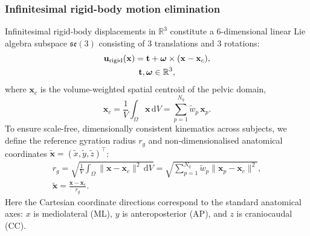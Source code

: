 \documentclass[pdflatex,sn-basic]{sn-jnl}
\begin{document}
\subsubsection{Infinitesimal rigid-body motion elimination}
Infinitesimal rigid-body displacements in $\mathbb{R}^3$ constitute a 6-dimensional linear Lie algebra subspace $\mathfrak{se}(3)$ consisting of 3 translations and 3 rotations:
\begin{equation}
\begin{gathered}
\mathbf u_{\rm rigid}(\mathbf x) = \mathbf t + \boldsymbol\omega \times (\mathbf x - \mathbf x_c), \\
 \mathbf t, \boldsymbol\omega \in \mathbb{R}^3,
\label{eq:rigid-field}
\end{gathered}
\end{equation}
where $\mathbf x_c$ is the volume-weighted spatial centroid of the pelvic domain,
\begin{equation}
\mathbf x_c = \frac{1}{V}\int_\Omega \mathbf x\,\mathrm dV = \sum_{p=1}^{N_q} \tilde w_p \, \mathbf x_p.
\end{equation}
To ensure scale-free, dimensionally consistent kinematics across subjects, we define the reference gyration radius $r_g$ and non-dimensionalised anatomical coordinates $\tilde{\mathbf x} = (\tilde x, \tilde y, \tilde z)^\top$:
\begin{equation}
\begin{gathered}
r_g = \sqrt{\frac{1}{V}\int_\Omega\|\mathbf x-\mathbf x_c\|^2\,\mathrm dV} = \sqrt{\sum_{p=1}^{N_q} \tilde w_p \|\mathbf x_p - \mathbf x_c\|^2}, \\
\tilde{\mathbf x} = \frac{\mathbf x - \mathbf x_c}{r_g}.
\label{eq:dimless-coords}
\end{gathered}
\end{equation}
Here the Cartesian coordinate directions correspond to the standard anatomical axes: $x$ is mediolateral (ML), $y$ is anteroposterior (AP), and $z$ is craniocaudal (CC).
\end{document}
